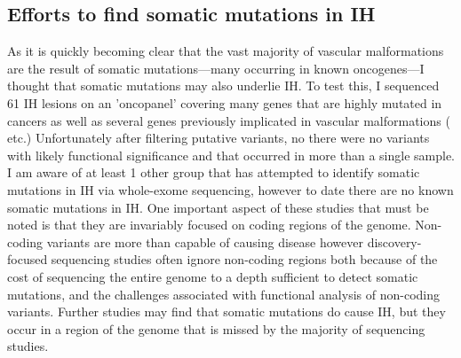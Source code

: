 \subsection{Efforts to find somatic mutations in IH}
As it is quickly becoming clear that the vast majority of vascular malformations are the result of somatic mutations—many occurring in known oncogenes—I thought that somatic mutations may also underlie IH. To test this, I sequenced 61 IH lesions on an 'oncopanel' covering many genes that are highly mutated in cancers as well as several genes previously implicated in vascular malformations ( etc.) Unfortunately after filtering putative variants, no there were no variants with likely functional significance and that occurred in more than a single sample. I am aware of at least 1 other group that has attempted to identify somatic mutations in IH via whole-exome sequencing, however to date there are no known somatic mutations in IH. One important aspect of these studies that must be noted is that they are invariably focused on coding regions of the genome. Non-coding variants are more than capable of causing disease however discovery-focused sequencing studies often ignore non-coding regions both because of the cost of sequencing the entire genome to a depth sufficient to detect somatic mutations, and the challenges associated with functional analysis of non-coding variants. Further studies may find that somatic mutations do cause IH, but they occur in a region of the genome that is missed by the majority of sequencing studies. 



















